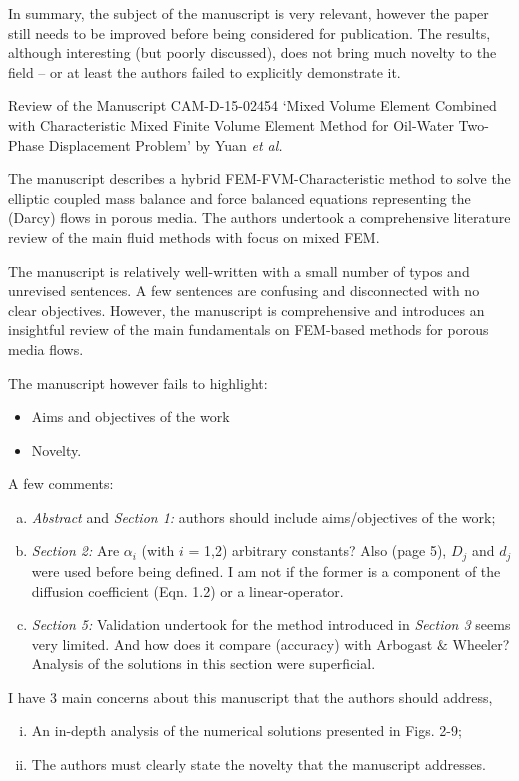 \documentclass[14pt,twoside]{report}
\begin{document}
In summary, the subject of the manuscript is very relevant, however the paper still needs to be improved before being considered for publication. The results, although interesting (but poorly discussed), does not bring much novelty to the field -- or at least the authors failed to explicitly demonstrate it. 


{
  }



\clearpage



\begin{center}
  {\Large Review of the Manuscript CAM-D-15-02454 `Mixed Volume Element Combined with Characteristic Mixed Finite Volume Element Method for Oil-Water Two-Phase Displacement Problem' by Yuan {\it et al.}}
\end{center}

\medskip

The manuscript describes a hybrid FEM-FVM-Characteristic method to solve the elliptic coupled mass balance and force balanced equations representing the (Darcy) flows in porous media. The authors undertook a comprehensive literature review of the main fluid methods with focus on mixed FEM.

The manuscript is relatively well-written with a small number of typos and unrevised sentences. A few sentences are confusing and disconnected with no clear objectives. However, the manuscript is comprehensive and introduces an insightful review of the main fundamentals on FEM-based methods for porous media flows. 

The manuscript however fails to highlight:
  \begin{itemize}
    \item Aims and objectives of the work
    \item Novelty.
  \end{itemize}
A few comments:
\begin{enumerate}[(a)] 
%
\item {\it Abstract} and {\it Section 1:} authors should include aims/objectives of the work;
%
\item {\it Section 2:} Are $\alpha_{i}$ (with $i$ = 1,2) arbitrary constants? Also (page 5), $D_{j}$ and $d_{j}$ were used before being defined. I am not if the former is a component of the diffusion coefficient (Eqn. 1.2) or a linear-operator.
%
\item {\it Section 5:} Validation undertook for the method introduced in {\it Section 3} seems very limited. And how does it compare (accuracy) with Arbogast $\&$ Wheeler? Analysis of the solutions in this section were superficial.
%
\end{enumerate}
I have 3 main concerns about this manuscript that the authors should address,
\begin{enumerate}[(i)]
\item An in-depth analysis of the numerical solutions presented in Figs. 2-9;
\item The authors must clearly state the novelty that the manuscript addresses.
\end{enumerate}
\end{document}
